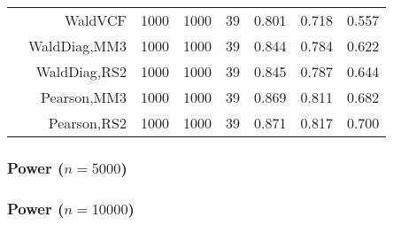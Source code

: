 \documentclass[
]{article}
\begin{document}
\begin{table}[H]
{\begin{tabular}[t]{lrrrrrrr}
\hspace{1em} & WaldVCF & 1000 & 1000 & 39 & 0.801 & 0.718 & 0.557\\

\hspace{1em} & WaldDiag,MM3 & 1000 & 1000 & 39 & 0.844 & 0.784 & 0.622\\

\hspace{1em} & WaldDiag,RS2 & 1000 & 1000 & 39 & 0.845 & 0.787 & 0.644\\

\hspace{1em} & Pearson,MM3 & 1000 & 1000 & 39 & 0.869 & 0.811 & 0.682\\

\hspace{1em} & Pearson,RS2 & 1000 & 1000 & 39 & 0.871 & 0.817 & 0.700\\
\bottomrule
\end{tabular}}
\endgroup{}
\end{table}

\hypertarget{power-n5000}{%
\subsubsection{\texorpdfstring{Power
(\(n=5000\))}{Power (n=5000)}}\label{power-n5000}}

\begin{table}[H]
\centering\begingroup\fontsize{7}{9}\selectfont

\endgroup{}
\end{table}

\hypertarget{power-n10000}{%
\subsubsection{\texorpdfstring{Power
(\(n=10000\))}{Power (n=10000)}}\label{power-n10000}}

\begin{table}[H]
\centering\begingroup\fontsize{7}{9}\selectfont

\endgroup{}
\end{table}
\end{document}
